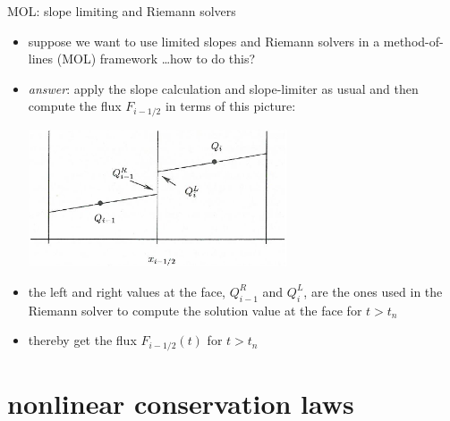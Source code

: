 \documentclass[10pt,dvipsnames,usepdftitle=false,
hyperref={pdftitle = {Finite volume methods},
    pdfauthor = {Ed Bueler}}]{beamer}
\begin{document}
\begin{frame}{MOL: slope limiting and Riemann solvers}

\begin{itemize}
\item suppose we want to use limited slopes and Riemann solvers in a method-of-lines (MOL) framework \dots how to do this?
\item \emph{answer}: apply the slope calculation and slope-limiter as usual and then compute the flux $F_{i-1/2}$ in terms of this picture:

\medskip
\begin{center}
\includegraphics[width=0.6\textwidth]{figs/leveque10p2}
\end{center}
\item the left and right values at the face, $Q_{i-1}^R$ and $Q_i^L$, are the ones used in the Riemann solver to compute the solution value at the face for $t>t_n$
\item thereby get the flux $F_{i-1/2}(t)$ for $t>t_n$
\end{itemize}
\end{frame}


\section{nonlinear conservation laws}
\end{document}
